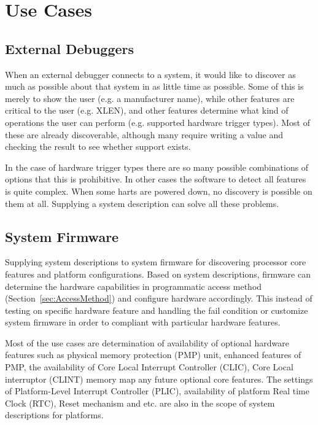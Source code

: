 \section{Use Cases}

\subsection{External Debuggers}

When an external debugger connects to a system, it would like to discover as
much as possible about that system in as little time as possible. Some of this
is merely to show the user (e.g. a manufacturer name), while other features are
critical to the user (e.g. XLEN), and other features determine what kind of
operations the user can perform (e.g. supported hardware trigger types). Most
of these are already discoverable, although many require writing a value and
checking the result to see whether support exists.

In the case of hardware trigger types there are so many possible combinations
of options that this is prohibitive. In other cases the software to detect all
features is quite complex. When some harts are powered down, no discovery is
possible on them at all. Supplying a system description can solve all these
problems.

\subsection{System Firmware}
Supplying system descriptions to system firmware for discovering processor 
core features and platform configurations. Based on system descriptions, firmware 
can determine the hardware capabilities in programmatic access method 
(Section~\ref{sec:AccessMethod}) and configure hardware accordingly. This instead 
of testing on specific hardware feature and handling the fail condition or customize 
system firmware in order to compliant with particular hardware features.

Most of the use cases are determination of availability of optional hardware 
features such as physical memory protection (PMP) unit, enhanced features of PMP,
the availability of Core Local Interrupt Controller (CLIC), Core Local interruptor 
(CLINT) memory map any future optional core features. The settings of Platform-Level 
Interrupt Controller (PLIC), availability of platform Real time Clock (RTC),
Reset mechanism and etc. are also in the scope of system descriptions for platforms.

